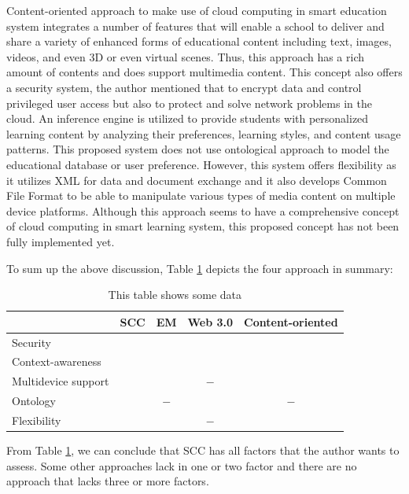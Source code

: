\documentclass[journal]{vgtc}                %
\newcommand{\cmark}{\ding{51}}%
\begin{document}
Content-oriented approach \cite{jeong2013content} to make use of cloud computing in smart education system integrates a number of features that will enable a school to deliver and share a variety of enhanced forms of educational content including text, images, videos, and even 3D or even virtual scenes. Thus, this approach has a rich amount of contents and does support multimedia content. This concept also offers a security system, the author mentioned that to encrypt data and control privileged user access but also to protect and solve network problems in the cloud. An inference engine is utilized to provide students with personalized learning content by analyzing their preferences, learning styles, and content usage patterns. This proposed system does not use ontological approach to model the educational database or user preference. However, this system offers flexibility as it utilizes XML for data and document exchange and it also develops Common File Format to be able to manipulate various types of media content on multiple device platforms. Although this approach seems to have a comprehensive concept of cloud computing in smart learning system, this proposed concept has not been fully implemented yet.


To sum up the above discussion, Table \ref{tab:comparison} depicts the four approach in summary:

\begin{table}[htb]
  \caption{This table shows some data}
  \label{tab:comparison}
  \scriptsize
  \begin{center}
  \begin{tabular}{lcccc}
     & SCC & EM & Web 3.0 & Content-oriented \\
    \hline
    Security & \cmark & \cmark & \cmark & \cmark \\
    Context-awareness & \cmark & \cmark & \cmark & \cmark \\
    Multidevice support & \cmark & \cmark & $-$ & \cmark \\
    Ontology & \cmark & $-$ & \cmark &  $-$ \\
    Flexibility & \cmark & \cmark &  $-$ & \cmark
  \end{tabular}
  \end{center}
\end{table}

From Table \ref{tab:comparison}, we can conclude that SCC has all factors that the author wants to assess. Some other approaches lack in one or two factor and there are no approach that lacks three or more factors.
\end{document}
